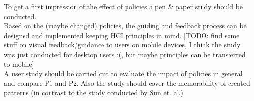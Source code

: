To get a first impression of the effect of policies a pen \& paper study should be conducted.\\

Based on the (maybe changed) policies, the guiding and feedback process can be designed and implemented keeping HCI principles in mind. [TODO: find some stuff on visual feedback/guidance to users on mobile devices, I think the study was just conducted for desktop users :(, but maybe principles can be transferred to mobile]\\

A user study should be carried out to evaluate the impact of policies in general and compare P1 and P2. Also the study should cover the memorability of created patterns (in contrast to the study conducted by Sun et. al.)\\